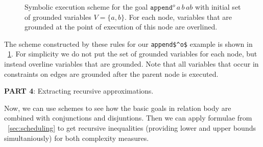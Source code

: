 \begin{figure}[t]
\begin{center}
\end{center}

\caption{Symbolic execution scheme for the goal $\texttt{append$^o$} \, a \, b \, ab$ with initial set of grounded variables $V = \{ a, b \}$. For each node, variables that are grounded at the point of execution of this node are overlined. }
\label{fig:example_scheme}
\end{figure}

The scheme constructed by these rules for our \lstinline|append$^o$| example is shown in \figureword~\ref{fig:example_scheme}. For simplicity we do not put the set of grounded variables for each node, but instead overline variables that are grounded. Note that all variables that occur in constraints on edges are grounded after the parent node is executed.

\FloatBarrier

\colorbox{blue!20}{\parbox{\textwidth}{\textbf{PART 4}: Extracting recursive approximations.}}

Now, we can use schemes to see how the basic goals in relation body are combined with conjunctions and disjuntions. Then we can apply formulae from \sectionword~\ref{sec:scheduling} to get recursive inequalities (providing lower and upper bounds simultaniously) for both complexity measures.

